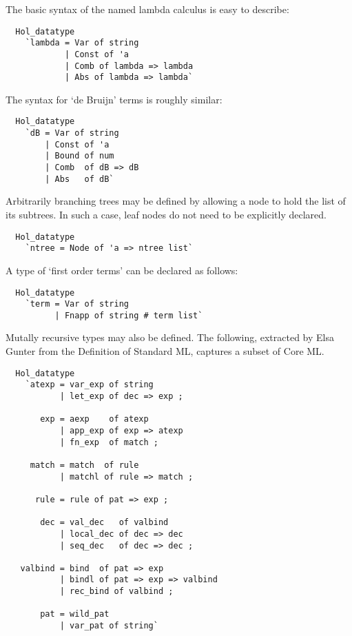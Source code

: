 The basic syntax of the named lambda calculus is easy to describe:
%
\begin{hol}
\begin{verbatim}
  Hol_datatype 
    `lambda = Var of string
            | Const of 'a
            | Comb of lambda => lambda
            | Abs of lambda => lambda`
\end{verbatim}
\end{hol}
% 
The syntax for `de Bruijn' terms is roughly similar:
%
\begin{hol}
\begin{verbatim}
  Hol_datatype 
    `dB = Var of string
        | Const of 'a
        | Bound of num
        | Comb  of dB => dB
        | Abs   of dB`
\end{verbatim}
\end{hol}
%
Arbitrarily branching trees may be defined by allowing a node to hold
the list of its subtrees. In such a case, leaf nodes do not need to be
explicitly declared.
%
\begin{hol}
\begin{verbatim}
  Hol_datatype 
    `ntree = Node of 'a => ntree list`
\end{verbatim}
\end{hol}
%
A type of `first order terms' can be declared as follows:
%
\begin{hol}
\begin{verbatim}
  Hol_datatype 
    `term = Var of string
          | Fnapp of string # term list`
\end{verbatim}
\end{hol}
%
Mutally recursive types may also be defined. The following, extracted by
Elsa Gunter from the Definition of Standard ML, captures a subset of
Core ML.
%
\begin{hol}
\begin{verbatim}
  Hol_datatype
    `atexp = var_exp of string
           | let_exp of dec => exp ;

       exp = aexp    of atexp
           | app_exp of exp => atexp
           | fn_exp  of match ;

     match = match  of rule
           | matchl of rule => match ;

      rule = rule of pat => exp ;

       dec = val_dec   of valbind
           | local_dec of dec => dec
           | seq_dec   of dec => dec ;

   valbind = bind  of pat => exp
           | bindl of pat => exp => valbind
           | rec_bind of valbind ;

       pat = wild_pat
           | var_pat of string`
\end{verbatim}
\end{hol}
